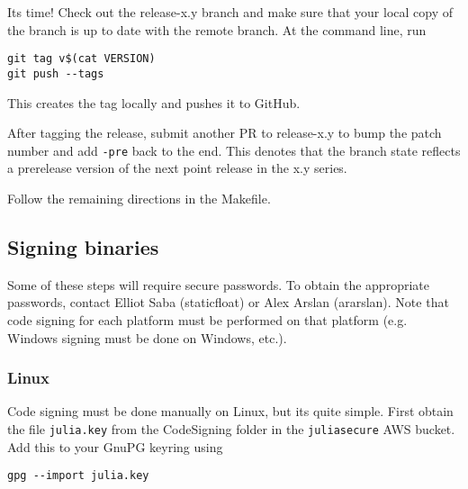 It{\textquotesingle}s time! Check out the release-x.y branch and make sure that your local copy of the branch is up to date with the remote branch. At the command line, run




\begin{lstlisting}
git tag v$(cat VERSION)
git push --tags
\end{lstlisting}



This creates the tag locally and pushes it to GitHub.



After tagging the release, submit another PR to release-x.y to bump the patch number and add \texttt{-pre} back to the end. This denotes that the branch state reflects a prerelease version of the next point release in the x.y series.



Follow the remaining directions in the Makefile.



\hypertarget{3023354583729859190}{}


\subsection{Signing binaries}



Some of these steps will require secure passwords. To obtain the appropriate passwords, contact Elliot Saba (staticfloat) or Alex Arslan (ararslan). Note that code signing for each platform must be performed on that platform (e.g. Windows signing must be done on Windows, etc.).



\hypertarget{3777966428630428250}{}


\subsubsection{Linux}



Code signing must be done manually on Linux, but it{\textquotesingle}s quite simple. First obtain the file \texttt{julia.key} from the CodeSigning folder in the \texttt{juliasecure} AWS bucket. Add this to your GnuPG keyring using




\begin{lstlisting}
gpg --import julia.key
\end{lstlisting}



